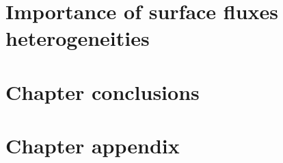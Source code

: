 \clearpage

\section{Importance of surface fluxes heterogeneities}
\label{sec:heterogeneities}
\clearpage

\section{Chapter conclusions}





\clearpage

\section{Chapter appendix}

